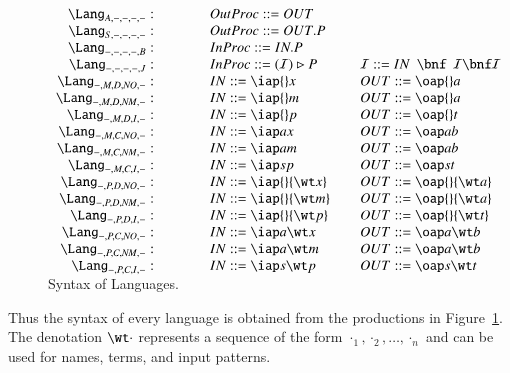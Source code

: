 \documentclass[submission,copyright,creativecommons]{eptcs}
\newcommand{\join}[1]{(#1)\rhd }
\begin{document}
\begin{figure}[t]
\begin{equation*}
\begin{array}{rcll}
\Lang_{A,-,-,-,-}:&&OutProc ::= OUT\\
\Lang_{S,-,-,-,-}:&&OutProc ::= OUT.P\quad\ \ \\
\Lang_{-,-,-,-,B}:&&InProc ::= IN.P\\
\Lang_{-,-,-,-,J}:&&InProc ::= \join{\mathcal{I}}P&\mathcal{I}::=IN \ \ \bnf\ \ \mathcal{I}\bnf\mathcal{I}\\
\Lang_{-,M,D,\mathit{NO},-}:&&IN ::= \iap {} x& OUT::= \oap {} a\\
\Lang_{-,M,D,\mathit{NM},-}:&&IN ::= \iap {} m& OUT::= \oap {} a\\
\Lang_{-,M,D,I,-}:&&IN ::= \iap {} p& OUT::= \oap {} t\\
\Lang_{-,M,C,\mathit{NO},-}:&&IN ::= \iap a x& OUT::= \oap a b\\
\Lang_{-,M,C,\mathit{NM},-}:&&IN ::= \iap a m& OUT::= \oap a b\\
\Lang_{-,M,C,I,-}:&&IN ::= \iap s p& OUT::= \oap s t\\
\Lang_{-,P,D,\mathit{NO},-}:&&IN ::= \iap {} {\wt x}& OUT::= \oap {} {\wt a}\\
\Lang_{-,P,D,\mathit{NM},-}:&&IN ::= \iap {} {\wt m}& OUT::= \oap {} {\wt a}\\
\Lang_{-,P,D,I,-}:&&IN ::= \iap {} {\wt p}& OUT::= \oap {} {\wt t}\\
\Lang_{-,P,C,\mathit{NO},-}:&&IN ::= \iap a {\wt x}& OUT::= \oap a {\wt b}\\
\Lang_{-,P,C,\mathit{NM},-}:&&IN ::= \iap a {\wt m}& OUT::= \oap a {\wt b}\\
\Lang_{-,P,C,I,-}:&\qquad&IN ::= \iap s {\wt p}\qquad& OUT::= \oap s {\wt t}\vspace{-0.4cm}
\end{array}
\end{equation*}
\caption{Syntax of Languages.}
\label{fig:syntax}
\vspace{-0.3cm}
\end{figure}

Thus the syntax of every language is obtained from the productions in Figure~\ref{fig:syntax}.
The denotation $\wt \cdot$ represents a sequence of the form $\cdot _1,\cdot _2,\ldots,\cdot _n$ and can be used for names, terms, and input patterns.
\end{document}
